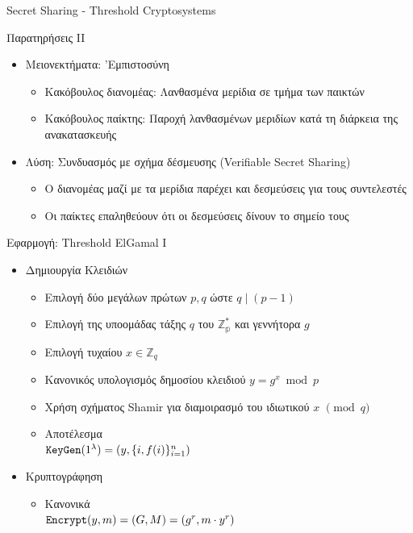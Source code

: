 \documentclass[handout]{beamer}
\begin{document}
\begin{section}{Secret Sharing - Threshold Cryptosystems}
\begin{frame}{Παρατηρήσεις II}
\begin{itemize}
\item Μειονεκτήματα: 'Εμπιστοσύνη
\begin{itemize}
\item Κακόβουλος διανομέας: Λανθασμένα μερίδια σε τμήμα των παικτών 
\pause
\item Κακόβουλος παίκτης: Παροχή λανθασμένων μεριδίων κατά τη διάρκεια της ανακατασκευής
\pause
\end{itemize}
\item Λύση: Συνδυασμός με σχήμα δέσμευσης (Verifiable Secret Sharing)
\pause
\begin{itemize}
\item Ο διανομέας μαζί με τα μερίδια παρέχει και δεσμεύσεις για τους συντελεστές
\item Οι παίκτες επαληθεύουν ότι οι δεσμεύσεις δίνουν το σημείο τους
\end{itemize}
\end{itemize}
\end{frame}

\begin{frame}{Εφαρμογή: Threshold ElGamal I}
\begin{itemize}
\item Δημιουργία Κλειδιών
\begin{itemize}
\item Επιλογή δύο μεγάλων πρώτων $p,q$ ώστε $q \mid (p-1)$  
\item Επιλογή της υποομάδας τάξης $q$ του $\mathbb{Z_p^*}$ και γεννήτορα $g$
\item Επιλογή τυχαίου $x \in \mathbb{Z}_q$
\item Κανονικός υπολογισμός δημοσίου κλειδιού $y = g^x \bmod{p}$

\item Χρήση σχήματος Shamir για διαμοιρασμό του ιδιωτικού $x$ $\pmod{q}$
\item Αποτέλεσμα \\ $\mathtt{KeyGen}(1^\lambda)=(y, \{ i, f(i) \}_{i=1}^n)$
\end{itemize}
\pause
\item Κρυπτογράφηση
\begin{itemize}
\item Κανονικά \\ $\mathtt{Encrypt}(y,m) = (G,M) = (g^r, m \cdot y^r)$
\end{itemize}
\end{itemize}
\end{frame}


\end{section}
\end{document}
